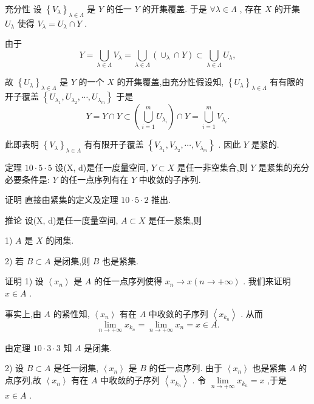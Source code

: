充分性 设 ${\left\{  {V}_{\lambda }\right\}  }_{\lambda  \in  \Lambda }$ 是 $Y$ 的任一 $Y$ 的开集覆盖. 于是 $\forall \lambda  \in  \Lambda$ , 存在 $X$ 的开集 ${U}_{\lambda }$ 使得 ${V}_{\lambda } = {U}_{\lambda } \cap  Y$ .

由于
$$Y = \mathop{\bigcup }\limits_{{\lambda  \in  \Lambda }}{V}_{\lambda } = \mathop{\bigcup }\limits_{{\lambda  \in  \Lambda }}\left( {{ \cup  }_{\lambda } \cap  Y}\right)  \subset  \mathop{\bigcup }\limits_{{\lambda  \in  \Lambda }}{U}_{\lambda },$$

故 ${\left\{  {U}_{\lambda }\right\}  }_{\lambda  \in  \Lambda }$ 是 $Y$ 的一个 $X$ 的开集覆盖,由充分性假设知, ${\left\{  {U}_{\lambda }\right\}  }_{\lambda  \in  \Lambda }$ 有有限的开子覆盖 $\left\{  {{U}_{{\lambda }_{1}},{U}_{{\lambda }_{2}},\cdots ,{U}_{{\lambda }_{m}}}\right\}$ 于是
$$Y = Y \cap  Y \subset  \left( {\mathop{\bigcup }\limits_{{i = 1}}^{m}{U}_{{\lambda }_{i}}}\right)  \cap  Y = \mathop{\bigcup }\limits_{{i = 1}}^{m}{V}_{{\lambda }_{i}}.$$

此即表明 ${\left\{  {V}_{\lambda }\right\}  }_{\lambda  \in  \Lambda }$ 有有限开子覆盖 $\left\{  {{V}_{{\lambda }_{1}},{V}_{{\lambda }_{2}},\cdots ,{V}_{{\lambda }_{m}}}\right\}$ . 因此 $Y$ 是紧的.

定理 ${10} \cdot  5 \cdot  5$ 设(X, d)是任一度量空间, $Y \subset  X$ 是任一非空集合,则 $Y$ 是紧集的充分必要条件是: $Y$ 的任一点序列有在 $Y$ 中收敛的子序列.

证明 直接由紧集的定义及定理 ${10} \cdot  5 \cdot  2$ 推出.

推论 设(X, d)是任一度量空间, $A \subset  X$ 是任一紧集,则

1) $A$ 是 $X$ 的闭集.

2) 若 $B \subset  A$ 是闭集,则 $B$ 也是紧集.

证明 1) 设 $\left\langle  {x}_{n}\right\rangle$ 是 $A$ 的任一点序列使得 ${x}_{n} \rightarrow  x\left( {n \rightarrow   + \infty }\right)$ . 我们来证明 $x \in  A$ .

事实上,由 $A$ 的紧性知, $\left\langle  {x}_{n}\right\rangle$ 有在 $A$ 中收敛的子序列 $\left\langle  {x}_{{k}_{n}}\right\rangle$ . 从而
$$\mathop{\lim }\limits_{{n \rightarrow   + \infty }}{x}_{{k}_{n}} = \mathop{\lim }\limits_{{n \rightarrow   + \infty }}{x}_{n} = x \in  A.$$

由定理 ${10} \cdot  3 \cdot  3$ 知 $A$ 是闭集.

2) 设 $B \subset  A$ 是任一闭集, $\left\langle  {x}_{n}\right\rangle$ 是 $B$ 的任一点序列. 由于 $\left\langle  {x}_{n}\right\rangle$ 也是紧集 $A$ 的点序列,故 $\left\langle  {x}_{n}\right\rangle$ 有在 $A$ 中收敛的子序列 $\left\langle  {x}_{{k}_{n}}\right\rangle$ . 令 $\mathop{\lim }\limits_{{n \rightarrow   + \infty }}{x}_{{k}_{n}} = x$ ,于是 $x \in  A$ .

